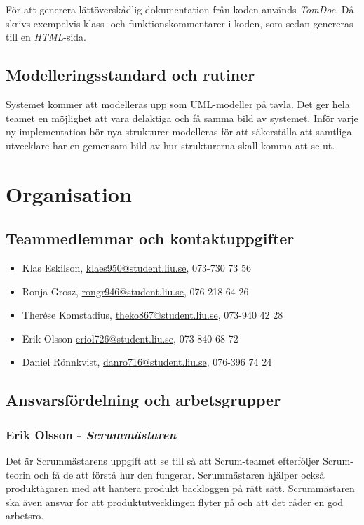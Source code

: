 \documentclass[a4paper,12pt,oneside,final]{extbook}
\begin{document}
För att generera lättöverskådlig dokumentation från koden används
\emph{TomDoc}. Då skrivs exempelvis klass- och funktionskommentarer i koden,
som sedan genereras till en \emph{HTML}-sida.

\section{Modelleringsstandard och rutiner}
Systemet kommer att modelleras upp som UML-modeller på tavla.
Det ger hela teamet en möjlighet att vara delaktiga och få samma bild
av systemet. Inför varje ny implementation bör nya strukturer modelleras
för att säkerställa att samtliga utvecklare har en gemensam bild av hur
strukturerna skall komma att se ut.

\chapter{Organisation}

\section{Teammedlemmar och kontaktuppgifter}
\begin{itemize}
  \item Klas Eskilson, \href{mailto:klaes950@student.liu.se}{klaes950@student.liu.se}, 073-730 73 56
  \item Ronja Grosz, \href{rongr946@student.liu.se}{rongr946@student.liu.se}, 076-218 64 26
  \item Therése Komstadius, \href{theko867@student.liu.se}{theko867@student.liu.se}, 073-940 42 28
  \item Erik Olsson \href{eriol726@student.liu.se}{eriol726@student.liu.se}, 073-840 68 72
  \item Daniel Rönnkvist, \href{danro716@student.liu.se}{danro716@student.liu.se}, 076-396 74 24
\end{itemize}

\section{Ansvarsfördelning och arbetsgrupper}
  \subsection{Erik Olsson - \emph{Scrummästaren}}
  Det är Scrummästarens uppgift att se till så att Scrum-teamet
  efterföljer Scrum-teorin och få de att förstå hur den fungerar.
  Scrummästaren hjälper också produktägaren med att hantera produkt
  backloggen på rätt sätt. Scrummästaren ska även ansvar för att
  produktutvecklingen flyter på och att det råder en god arbetsro.
\end{document}
